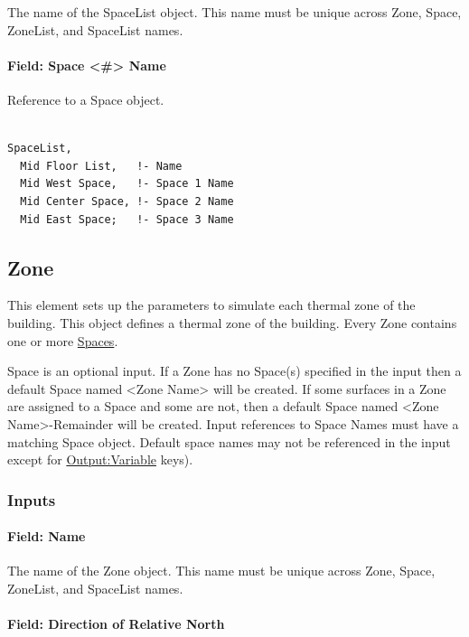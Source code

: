 The name of the SpaceList object. This name must be unique across Zone, Space, ZoneList, and SpaceList names.

\paragraph{Field: Space \textless{}\#\textgreater{} Name}\label{field-space-name}

Reference to a Space object.

\begin{lstlisting}

SpaceList,
  Mid Floor List,   !- Name
  Mid West Space,   !- Space 1 Name
  Mid Center Space, !- Space 2 Name
  Mid East Space;   !- Space 3 Name
\end{lstlisting}


\subsection{Zone}\label{zone}

This element sets up the parameters to simulate each thermal zone of the building.
This object defines a thermal zone of the building. Every Zone contains one or more \hyperref[space]{Spaces}.

Space is an optional input. If a Zone has no Space(s) specified in the input then a default Space named \textless{}Zone Name\textgreater{} will be created.
If some surfaces in a Zone are assigned to a Space and some are not, then a default Space
named \textless{}Zone Name\textgreater{}-Remainder will be created. 
Input references to Space Names must have a matching Space object. 
Default space names may not be referenced in the input except for \hyperref[outputvariable]{Output:Variable} keys).

\subsubsection{Inputs}\label{inputs-048}

\paragraph{Field: Name}\label{zone-object-name}

The name of the Zone object. This name must be unique across Zone, Space, ZoneList, and SpaceList names.

\paragraph{Field: Direction of Relative North}\label{field-direction-of-relative-north}

